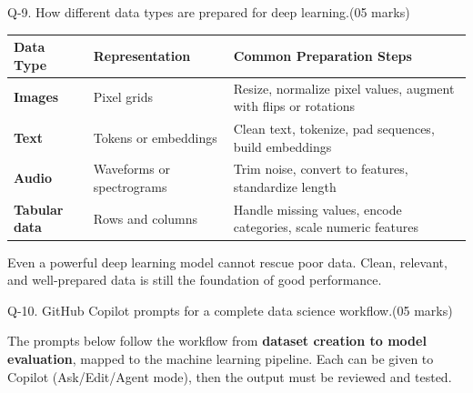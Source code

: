 \documentclass[11pt,a4paper]{article}
\newcommand{\question}[2]{%
  \begin{qbox}#1\hfill\textcolor{accent}{(05 marks)}\\[2pt]#2\end{qbox}%
}
\begin{document}
\question{Q-9. How different data types are prepared for deep learning.}{}

\begin{center}
\begin{tabular}{@{}>{\bfseries}p{3.0cm}p{4.0cm}p{6.0cm}@{}}
\toprule
\rowcolor{primary!15}
\textbf{Data Type} & \textbf{Representation} & \textbf{Common Preparation Steps} \\
\midrule
Images & Pixel grids & Resize, normalize pixel values, augment with flips or rotations \\
Text & Tokens or embeddings & Clean text, tokenize, pad sequences, build embeddings \\
Audio & Waveforms or spectrograms & Trim noise, convert to features, standardize length \\
Tabular data & Rows and columns & Handle missing values, encode categories, scale numeric features \\
\bottomrule
\end{tabular}
\end{center}

\begin{conceptbox}
Even a powerful deep learning model cannot rescue poor data. Clean, relevant, and well-prepared data is still the foundation of good performance.
\end{conceptbox}

\question{Q-10. GitHub Copilot prompts for a complete data science workflow.}{}

The prompts below follow the workflow from \textbf{dataset creation to model evaluation}, mapped to the machine learning pipeline. Each can be given to Copilot (Ask/Edit/Agent mode), then the output must be reviewed and tested.
\end{document}

